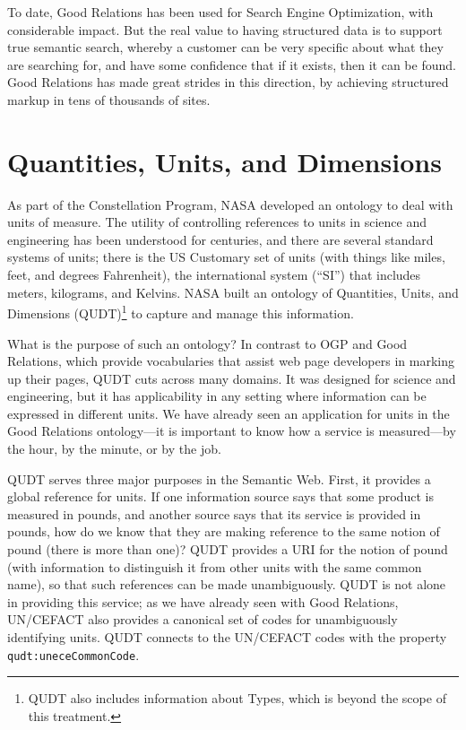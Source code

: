 To date, Good Relations has been used for Search Engine Optimization,
with considerable impact. But the real value to having structured data
is to support true semantic search, whereby a customer can be very
specific about what they are searching for, and have some confidence
that if it exists, then it can be found. Good Relations has made great
strides in this direction, by achieving structured markup in tens of
thousands of sites.

\section{Quantities, Units, and Dimensions}
\label{QUDT}

As part of the Constellation Program, NASA developed an ontology to deal
with units of measure. The utility of controlling references to units in
science and engineering has been understood for centuries, and there are
several standard systems of units; there is the US Customary set of
units (with things like miles, feet, and degrees Fahrenheit), the
international system (``SI'') that includes meters, kilograms, and
Kelvins. NASA built an ontology of Quantities, Units, and Dimensions
(QUDT)\footnote{QUDT also includes information about Types, which is beyond the scope
of this treatment.}
to capture and manage this information.

What is the purpose of such an ontology? In contrast to OGP and Good
Relations, which provide vocabularies that assist web page developers in
marking up their pages, QUDT cuts across many domains. It was designed
for science and engineering, but it has applicability in any setting
where information can be expressed in different units. We have already
seen an application for units in the Good Relations ontology---it is
important to know how a service is measured---by the hour, by the
minute, or by the job.

QUDT serves three major purposes in the Semantic Web. First, it provides
a global reference for units. If one information source says that some
product is measured in pounds, and another source
says that its service is provided in pounds, how do we know that they
are making reference to the same notion of pound (there is more than
one)? QUDT provides a URI for the notion of pound (with information to
distinguish it from other units with the same common name), so that such
references can be made unambiguously. QUDT is not alone in providing
this service; as we have already seen with Good Relations, UN/CEFACT
also provides a canonical set of codes for unambiguously identifying
units. QUDT connects to the UN/CEFACT codes with the property
\texttt{qudt:uneceCommonCode}.

